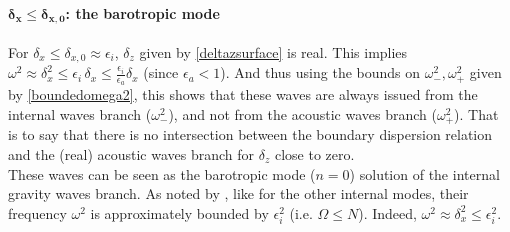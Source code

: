 \paragraph{$\boldsymbol{\delta_x \le \delta_{x,0}}$: the barotropic mode}
For $\delta_x \le \delta_{x,0} \approx \epsilon_i$, $\delta_z$ given by \ref{deltazsurface} is real. This implies $\omega^2 \approx \delta_x^2 \le \epsilon_i\, \delta_x \le \frac{\epsilon_i}{\epsilon_a}\delta_x$ (since $\epsilon_a < 1$). And thus using the bounds on $\omega_-^2, \omega_+^2$ given by \ref{boundedomega2}, this shows that these waves are always issued from the internal waves branch ($\omega_-^2$), and not from the acoustic waves branch ($\omega_+^2$). That is to say that there is no intersection between the boundary dispersion relation and the (real) acoustic waves branch for $\delta_z$ close to zero.\\
These waves can be seen as the barotropic mode ($n=0$) solution of the internal gravity waves branch. As noted by \cite{dukowicz_2013}, like for the other internal modes, their frequency $\omega^2$ is approximately bounded by $\epsilon_i^2$ (i.e. $\Omega \le N$). Indeed, $\omega^2 \approx \delta_x^2 \le \epsilon_i^2$.
%
